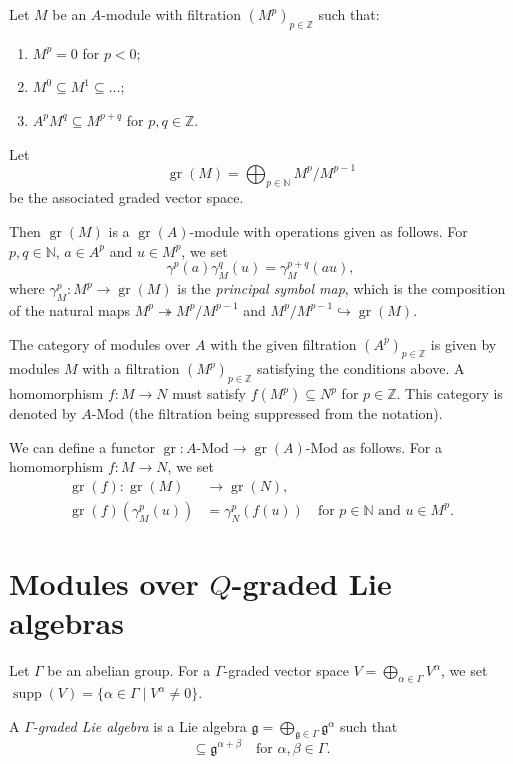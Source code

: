 \documentclass[a4paper, 12pt, reqno]{amsart}
\theoremstyle{remark}
\DeclareMathOperator{\gr}{gr}
\DeclareMathOperator{\supp}{supp}
\begin{document}
Let $M$ be an $A$-module with filtration $(M^p)_{p \in \mathbb{Z}}$ such that:
\begin{enumerate}
\item $M^p = 0$ for $p < 0$;
\item $M^0 \subseteq M^1 \subseteq \dots$;
\item $A^pM^q \subseteq M^{p + q}$ for $p, q \in \mathbb{Z}$.
\end{enumerate}
Let
\begin{equation*}
  \gr(M) = \bigoplus_{p \in \mathbb{N}}M^p/M^{p - 1}
\end{equation*}
be the associated graded vector space.

Then $\gr(M)$ is a $\gr(A)$-module with operations given as follows.
For $p, q \in \mathbb{N}$, $a \in A^p$ and $u \in M^p$, we set
\begin{equation*}
  \gamma^p(a)\gamma^q_M(u) = \gamma^{p + q}_M(au),
\end{equation*}
where $\gamma^p_M: M^p \to \gr(M)$ is the \emph{principal symbol map}, which is the composition of the natural maps $M^p \twoheadrightarrow M^p/M^{p - 1}$ and $M^p/M^{p - 1} \hookrightarrow \gr(M)$.

The category of modules over $A$ with the given filtration $(A^p)_{p \in \mathbb{Z}}$ is given by modules $M$ with a filtration $(M^p)_{p \in \mathbb{Z}}$ satisfying the conditions above.
A homomorphism $f: M \to N$ must satisfy $f(M^p) \subseteq N^p$ for $p \in \mathbb{Z}$.
This category is denoted by $A\text{-Mod}$ (the filtration being suppressed from the notation).

We can define a functor $\gr: A\text{-Mod} \to \gr(A)\text{-Mod}$ as follows.
For a homomorphism $f: M \to N$, we set
\begin{align*}
  \gr(f): \gr(M) &\to \gr(N), \\
  \gr(f)(\gamma_M^p(u)) &= \gamma_N^p(f(u)) \quad \text{for $p \in \mathbb{N}$ and $u \in M^p$}.
\end{align*}

\section{Modules over $Q$-graded Lie algebras}
\label{sec:modules-over-q}

Let $\Gamma$ be an abelian group.
For a $\Gamma$-graded vector space $V = \bigoplus_{\alpha \in \Gamma}V^{\alpha}$, we set $\supp(V) = \{\alpha \in \Gamma \mid V^{\alpha} \neq 0\}$.

A \emph{$\Gamma$-graded Lie algebra} is a Lie algebra $\mathfrak{g} = \bigoplus_{\mathfrak{g} \in \Gamma}\mathfrak{g}^{\alpha}$ such that
\begin{equation*}
  [\mathfrak{g}^{\alpha}, \mathfrak{g}^{\beta}] \subseteq \mathfrak{g}^{\alpha + \beta} \quad \text{for $\alpha, \beta \in \Gamma$}.
\end{equation*}
\end{document}
